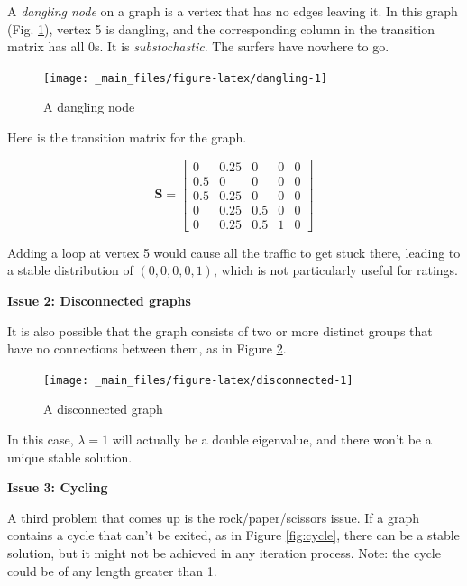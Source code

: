 \documentclass[
]{book}
\theoremstyle{definition}
\theoremstyle{definition}
\theoremstyle{definition}
\theoremstyle{definition}
\theoremstyle{remark}
\begin{document}
A \emph{dangling node} on a graph is a vertex that has no edges leaving it. In this graph (Fig. \ref{fig:dangling}), vertex 5 is dangling, and the corresponding column in the transition matrix has all 0s. It is \emph{substochastic}. The surfers have nowhere to go.

\begin{figure}

{\centering \texttt{[image: \_main\_files/figure-latex/dangling-1]} 

}

\caption{A dangling node}\label{fig:dangling}
\end{figure}

Here is the transition matrix for the graph.

\[\mathbf{S}=\begin{bmatrix} 0 & 0.25 & 0 & 0 & 0\\
0.5 & 0 & 0 & 0 & 0\\
0.5 & 0.25 & 0 & 0 & 0\\
0 & 0.25 & 0.5 & 0 & 0\\0 & 0.25 & 0.5 & 1 & 0\end{bmatrix}\]

Adding a loop at vertex 5 would cause all the traffic to get stuck there, leading to a stable distribution of \((0,0,0,0,1)\), which is not particularly useful for ratings.

\textbf{Issue 2: Disconnected graphs}

It is also possible that the graph consists of two or more distinct groups that have no connections between them, as in Figure \ref{fig:disconnected}.

\begin{figure}

{\centering \texttt{[image: \_main\_files/figure-latex/disconnected-1]} 

}

\caption{A disconnected graph}\label{fig:disconnected}
\end{figure}

In this case, \(\lambda=1\) will actually be a double eigenvalue, and there won't be a unique stable solution.

\textbf{Issue 3: Cycling}

A third problem that comes up is the rock/paper/scissors issue. If a graph contains a cycle that can't be exited, as in Figure \ref{fig:cycle}, there can be a stable solution, but it might not be achieved in any iteration process. Note: the cycle could be of any length greater than 1.
\end{document}
